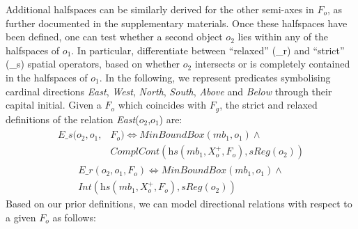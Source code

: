 \documentclass{article}
\begin{document}
Additional halfspaces can be similarly derived for the other semi-axes in $F_o$, as further documented in the supplementary materials. Once these halfspaces have been defined, one can test whether a second object $o_2$ lies within any of the halfspaces of $o_1$. In particular, \cite{borrmann_query_2010} differentiate between ``relaxed'' (\_r) and ``strict'' (\_s) spatial operators, based on whether $o_2$ intersects or is completely contained in the halfspaces of $o_1$. In the following, we represent predicates symbolising cardinal directions \textit{East}, \textit{West}, \textit{North}, \textit{South}, \textit{Above} and \textit{Below} through their capital initial. Given a $F_o$ which coincides with $F_g$, the strict and relaxed 
definitions of the relation \textit{East}($o_2$,$o_1$) are:
\begin{align}
\begin{split}  \textit{E\_s} (o_2, o_1, &{}F_o) \Leftrightarrow \textit{MinBoundBox}(mb_1,o_1) \wedge \\
&  \textit{ComplCont}(\textit{hs}(mb_1,X_{o}^{+}, F_o),\textit{sReg}(o_2)) \end{split}
\end{align}
\begin{multline}
\textit{E\_r} (o_2,o_1,F_o) \Leftrightarrow \textit{MinBoundBox}(mb_1,o_1) \wedge \\ \textit{Int}(\textit{hs}(mb_1,X_{o}^{+}, F_o),\textit{sReg}(o_2))
\end{multline}
Based on our prior definitions, we can model directional relations with respect to a given $F_o$ as follows:
\end{document}
